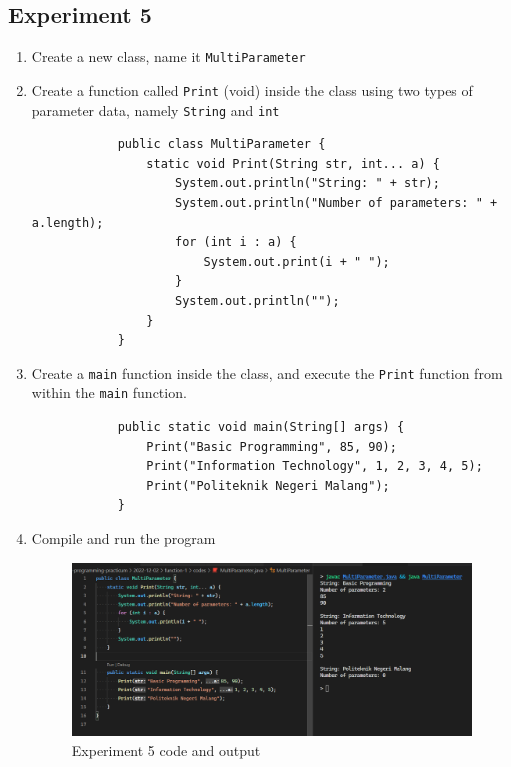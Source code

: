 \documentclass[12pt,titlepage]{article}
\begin{document}
\subsection{Experiment 5}
\begin{enumerate}
    \item Create a new class, name it \texttt{MultiParameter}
    \item {
        Create a function called \texttt{Print} (void) inside the class using two types of
        parameter data, namely \texttt{String} and \texttt{int}

        \begin{verbatim}
            public class MultiParameter {
                static void Print(String str, int... a) {
                    System.out.println("String: " + str);
                    System.out.println("Number of parameters: " + a.length);
                    for (int i : a) {
                        System.out.print(i + " ");
                    }
                    System.out.println("");
                }
            }
        \end{verbatim}
    }
    \item {
        Create a \texttt{main} function inside the class, and execute the \texttt{Print} function
        from within the \texttt{main} function.

        \begin{verbatim}
            public static void main(String[] args) {
                Print("Basic Programming", 85, 90);
                Print("Information Technology", 1, 2, 3, 4, 5);
                Print("Politeknik Negeri Malang");
            }
        \end{verbatim}
    }
    \item {
        Compile and run the program

        \begin{figure}[h]
            \centering
            \includegraphics[width=.8\textwidth]{./images/multi-parameter.png}
            \caption{Experiment 5 code and output}
        \end{figure}
    }
\end{enumerate}
\end{document}
